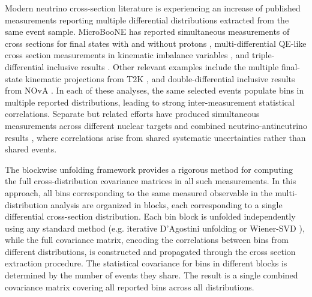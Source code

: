 \documentclass[aps,prd,twocolumn,showpacs,superscriptaddress,floatfix]{revtex4-2}
\begin{document}
Modern neutrino cross-section literature is experiencing an increase of published measurements reporting multiple differential distributions extracted from the same event sample. MicroBooNE has reported simultaneous measurements of cross sections for final states with and without protons \cite{MicroBooNE:2024zkh,MicroBooNE:2024zwf}, multi-differential QE-like cross section measurements in kinematic imbalance variables \cite{MicroBooNE:2023tzj,MicroBooNE:2023cmw}, and triple-differential inclusive results \cite{MicroBooNE:2023foc}. Other relevant examples include the multiple final-state kinematic projections from T2K \cite{T2K:2018rnz,T2K:2021naz}, and double-differential inclusive results from NOvA \cite{NOvA:2021eqi,NOvA:2024zmr,NOvA:2024rov}. In each of these analyses, the same selected events populate bins in multiple reported distributions, leading to strong inter-measurement statistical correlations. Separate but related efforts have produced simultaneous measurements across different nuclear targets \cite{T2K:2020jav,MINERvA:2023kuz,MINERvA:2022djk} and combined neutrino-antineutrino results \cite{T2K:2020sbd}, where correlations arise from shared systematic uncertainties rather than shared events.

The blockwise unfolding framework \cite{Gardiner:2024gdy} provides a rigorous method for computing the full cross-distribution covariance matrices in all such measurements. In this approach, all bins corresponding to the same measured observable in the multi-distribution analysis are organized in blocks, each corresponding to a single differential cross-section distribution. Each bin block is unfolded independently using any standard method (e.g. iterative D'Agostini unfolding \cite{DAgostini:1994fjx} or Wiener-SVD \cite{Tang:2017rob}), while the full covariance matrix, encoding the correlations between bins from different distributions, is constructed and propagated through the cross section extraction procedure. The statistical covariance for bins in different blocks is determined by the number of events they share. The result is a single combined covariance matrix covering all reported bins across all distributions.
\end{document}
